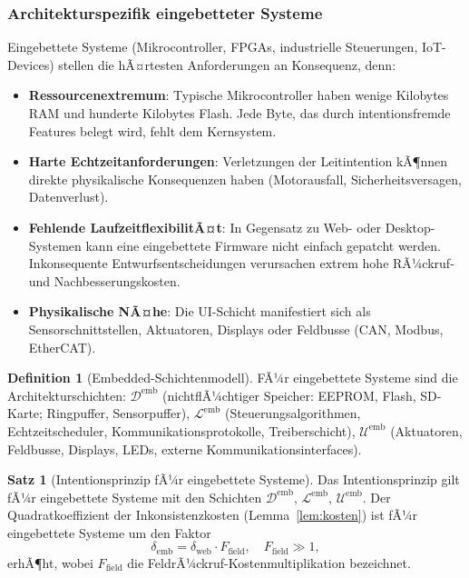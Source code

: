 ﻿\documentclass[a4paper,12pt]{article}
\theoremstyle{definition}
\newtheorem{definition}{Definition}
\newtheorem{satz}{Satz}
\begin{document}
\subsubsection{Architekturspezifik eingebetteter Systeme}

Eingebettete Systeme (Mikrocontroller, FPGAs, industrielle Steuerungen,
IoT-Devices) stellen die hÃ¤rtesten Anforderungen an Konsequenz, denn:

\begin{itemize}
    \item \textbf{Ressourcenextremum}: Typische Mikrocontroller haben
          wenige Kilobytes RAM und hunderte Kilobytes Flash. Jede Byte,
          das durch intentionsfremde Features belegt wird, fehlt dem
          Kernsystem.
    \item \textbf{Harte Echtzeitanforderungen}: Verletzungen der
          Leitintention kÃ¶nnen direkte physikalische Konsequenzen haben
          (Motorausfall, Sicherheitsversagen, Datenverlust).
    \item \textbf{Fehlende LaufzeitflexibilitÃ¤t}: In Gegensatz zu Web-
          oder Desktop-Systemen kann eine eingebettete Firmware nicht
          einfach gepatcht werden. Inkonsequente Entwurfsentscheidungen
          verursachen extrem hohe RÃ¼ckruf- und Nachbesserungskosten.
    \item \textbf{Physikalische NÃ¤he}: Die UI-Schicht manifestiert sich
          als Sensorschnittstellen, Aktuatoren, Displays oder Feldbusse
          (CAN, Modbus, EtherCAT).
\end{itemize}

\begin{definition}[Embedded-Schichtenmodell]
FÃ¼r eingebettete Systeme sind die Architekturschichten:
$\mathcal{D}^{\text{emb}}$ (nichtflÃ¼chtiger Speicher: EEPROM, Flash,
SD-Karte; Ringpuffer, Sensorpuffer),
$\mathcal{L}^{\text{emb}}$ (Steuerungsalgorithmen, Echtzeitscheduler,
Kommunikationsprotokolle, Treiberschicht),
$\mathcal{U}^{\text{emb}}$ (Aktuatoren, Feldbusse, Displays, LEDs,
externe Kommunikationsinterfaces).
\end{definition}

\begin{satz}[Intentionsprinzip fÃ¼r eingebettete Systeme]\label{satz:embedded}
Das Intentionsprinzip gilt fÃ¼r eingebettete Systeme mit den Schichten
$\mathcal{D}^{\text{emb}}$, $\mathcal{L}^{\text{emb}}$,
$\mathcal{U}^{\text{emb}}$. Der Quadratkoeffizient der Inkonsistenzkosten
(Lemma~\ref{lem:kosten}) ist fÃ¼r eingebettete Systeme um den Faktor
\[
\delta_{\text{emb}} = \delta_{\text{web}} \cdot F_{\text{field}},
\quad F_{\text{field}} \gg 1,
\]
erhÃ¶ht, wobei $F_{\text{field}}$ die FeldrÃ¼ckruf-Kostenmultiplikation
bezeichnet.
\end{satz}
\end{document}
